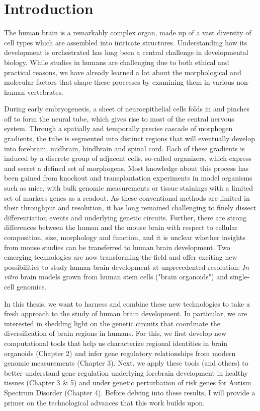 \thispagestyle{plain}
\section{Introduction}




The human brain is a remarkably complex organ, made up of a vast diversity of cell types which are assembled into intricate structures. Understanding how its development is orchestrated has long been a central challenge in developmental biology. While studies in humans are challenging due to both ethical and practical reasons, we have already learned a lot about the morphological and molecular factors that shape these processes by examining them in various non-human vertebrates.

During early embryogenesis, a sheet of neuroepithelial cells folds in and pinches off to form the neural tube, which gives rise to most of the central nervous system. Through a spatially and temporally precise cascade of morphogen gradients, the tube is segmented into distinct regions that will eventually develop into forebrain, midbrain, hindbrain and spinal cord. Each of these gradients is induced by a discrete group of adjacent cells, so-called organizers, which express and secret a defined set of morphogens. Most knowledge about this process has been gained from knockout and transplantation experiments in model organisms such as mice, with bulk genomic measurements or tissue stainings with a limited set of markers genes as a readout. As these conventional methods are limited in their throughput and resolution, it has long remained challenging to finely dissect differentiation events and underlying genetic circuits. Further, there are strong differences between the human and the mouse brain with respect to cellular composition, size, morphology and function, and it is unclear whether insights from mouse studies can be transferred to human brain development. Two emerging technologies are now transforming the field and offer exciting new possibilities to study human brain development at unprecedented resolution: ​\textit{In vitro} brain models grown from human stem cells ("brain organoids") and single-cell genomics.

In this thesis, we want to harness and combine these new technologies to take a fresh approach to the study of human brain development. In particular, we are interested in shedding light on the genetic circuits that coordinate the diversification of brain regions in humans. For this, we first develop new computational tools that help us characterize regional identities in brain organoids (Chapter 2) and infer gene regulatory relationships from modern genomic measurements (Chapter 3). Next, we apply these tools (and others) to better understand gene regulation underlying forebrain development in healthy tissues (Chapter 3 \& 5) and under genetic perturbation of risk genes for Autism Spectrum Disorder (Chapter 4). Before delving into these results, I will provide a primer on the technological advances that this work builds upon.

